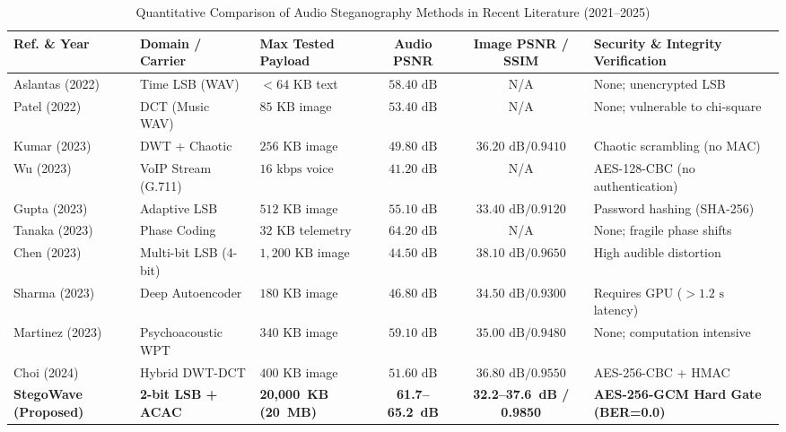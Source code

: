 \documentclass[10pt,conference]{IEEEtran}
\begin{document}
\begin{table}[htbp]
\centering
\caption{Quantitative Comparison of Audio Steganography Methods in Recent Literature (2021--2025)}
\label{tab:lit_comparison}
\begin{tabular}{l l p{2.8cm} c c p{3.2cm}}
\toprule
\textbf{Ref. \& Year} & \textbf{Domain / Carrier} & \textbf{Max Tested Payload} & \textbf{Audio PSNR} & \textbf{Image PSNR / SSIM} & \textbf{Security \& Integrity Verification} \\
\midrule
Aslantas \cite{aslantas2022} (2022) & Time LSB (WAV) & $< 64\text{ KB}$ text & $58.40\text{ dB}$ & N/A & None; unencrypted LSB \\
Patel \cite{patel2022} (2022) & DCT (Music WAV) & $85\text{ KB}$ image & $53.40\text{ dB}$ & N/A & None; vulnerable to chi-square \\
Kumar \cite{kumar2023} (2023) & DWT + Chaotic & $256\text{ KB}$ image & $49.80\text{ dB}$ & $36.20\text{ dB} / 0.9410$ & Chaotic scrambling (no MAC) \\
Wu \cite{wu2023} (2023) & VoIP Stream (G.711) & $16\text{ kbps}$ voice & $41.20\text{ dB}$ & N/A & AES-128-CBC (no authentication) \\
Gupta \cite{gupta2023} (2023) & Adaptive LSB & $512\text{ KB}$ image & $55.10\text{ dB}$ & $33.40\text{ dB} / 0.9120$ & Password hashing (SHA-256) \\
Tanaka \cite{tanaka2023} (2023) & Phase Coding & $32\text{ KB}$ telemetry & $64.20\text{ dB}$ & N/A & None; fragile phase shifts \\
Chen \cite{chen2023} (2023) & Multi-bit LSB (4-bit) & $1,200\text{ KB}$ image & $44.50\text{ dB}$ & $38.10\text{ dB} / 0.9650$ & High audible distortion \\
Sharma \cite{sharma2023} (2023) & Deep Autoencoder & $180\text{ KB}$ image & $46.80\text{ dB}$ & $34.50\text{ dB} / 0.9300$ & Requires GPU ($>1.2\text{ s}$ latency) \\
Martinez \cite{martinez2023} (2023) & Psychoacoustic WPT & $340\text{ KB}$ image & $59.10\text{ dB}$ & $35.00\text{ dB} / 0.9480$ & None; computation intensive \\
Choi \cite{choi2024} (2024) & Hybrid DWT-DCT & $400\text{ KB}$ image & $51.60\text{ dB}$ & $36.80\text{ dB} / 0.9550$ & AES-256-CBC + HMAC \\
\midrule
\textbf{StegoWave (Proposed)} & \textbf{2-bit LSB + ACAC} & \textbf{20,000~KB (20~MB)} & \textbf{61.7--65.2~dB} & \textbf{32.2--37.6~dB / 0.9850} & \textbf{AES-256-GCM Hard Gate (BER=0.0)} \\
\bottomrule
\end{tabular}
\end{table}
\end{document}
